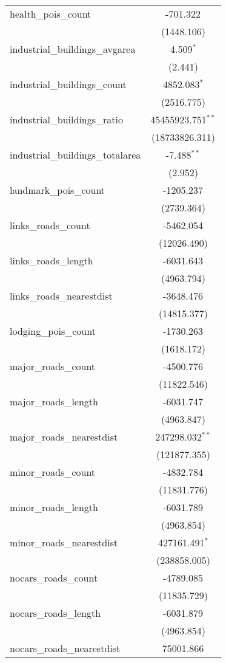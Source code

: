 \begin{table}[!htbp]
\begin{tabular}{@{\extracolsep{5pt}}lc}
 health_pois_count & -701.322$^{}$ \\
  & (1448.106) \\
 industrial_buildings_avgarea & 4.509$^{*}$ \\
  & (2.441) \\
 industrial_buildings_count & 4852.083$^{*}$ \\
  & (2516.775) \\
 industrial_buildings_ratio & 45455923.751$^{**}$ \\
  & (18733826.311) \\
 industrial_buildings_totalarea & -7.488$^{**}$ \\
  & (2.952) \\
 landmark_pois_count & -1205.237$^{}$ \\
  & (2739.364) \\
 links_roads_count & -5462.054$^{}$ \\
  & (12026.490) \\
 links_roads_length & -6031.643$^{}$ \\
  & (4963.794) \\
 links_roads_nearestdist & -3648.476$^{}$ \\
  & (14815.377) \\
 lodging_pois_count & -1730.263$^{}$ \\
  & (1618.172) \\
 major_roads_count & -4500.776$^{}$ \\
  & (11822.546) \\
 major_roads_length & -6031.747$^{}$ \\
  & (4963.847) \\
 major_roads_nearestdist & 247298.032$^{**}$ \\
  & (121877.355) \\
 minor_roads_count & -4832.784$^{}$ \\
  & (11831.776) \\
 minor_roads_length & -6031.789$^{}$ \\
  & (4963.854) \\
 minor_roads_nearestdist & 427161.491$^{*}$ \\
  & (238858.005) \\
 nocars_roads_count & -4789.085$^{}$ \\
  & (11835.729) \\
 nocars_roads_length & -6031.879$^{}$ \\
  & (4963.854) \\
 nocars_roads_nearestdist & 75001.866$^{}$ \\

\end{tabular}
\end{table}
